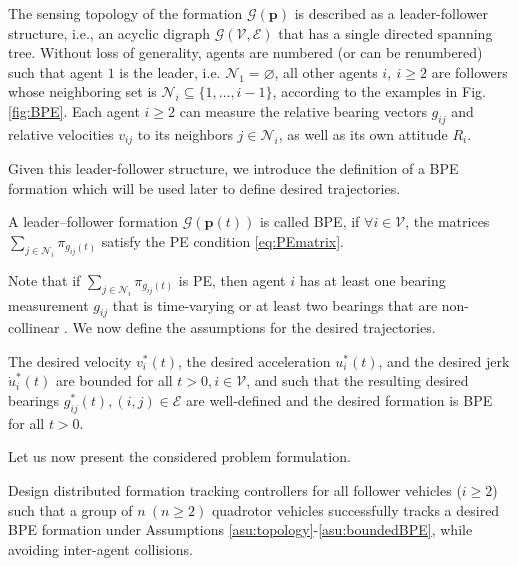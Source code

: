 \begin{asu} \label{asu:topology} 
    The sensing topology of the formation $\mathcal G (\boldsymbol p)$ is described as a leader-follower structure, i.e., an acyclic digraph $\mathcal{G}(\mathcal{V}, \mathcal{E})$ that has a single directed spanning tree. 
    Without loss of generality, agents are numbered (or can be renumbered) such that agent $1$ is the leader, i.e.  $\mathcal{N}_1= \varnothing$,  all other agents $i, \ i\ge 2$ are followers whose neighboring set is $\mathcal{N}_i  \subseteq \{1, \ldots, i-1\}$, according to the examples in Fig. \ref{fig:BPE}.
    Each agent $i \geq 2$ can measure the relative bearing vectors $g_{ij}$ and relative velocities $v_{ij}$ to its neighbors $j \in \mathcal{N}_i$, as well as its own attitude $R_i$. %
\end{asu}

Given this leader-follower structure, we introduce the definition of a BPE formation \cite{tang2021formation} which will be used later to define desired trajectories.
\begin{defi} \label{def:BPE}
    A leader–follower formation $\mathcal{G}(\boldsymbol p(t))$ is called BPE, if $\forall i \in \mathcal{V}$, the matrices $\sum_{j\in \mathcal{N}_i} \pi_{g_{ij}(t)}$ satisfy the PE condition \eqref{eq:PEmatrix}.
\end{defi}
Note that if $\sum_{j\in \mathcal{N}_i} \pi_{g_{ij}(t)}$ is PE, then agent $i$ has at least one bearing measurement $g_{ij}$ that is time-varying or at least two bearings that are non-collinear \cite[Lemma 1]{tang2021formation}. We now define the assumptions for the desired trajectories.
\begin{asu} \label{asu:boundedBPE}
    The desired velocity $v_{i}^*(t)$, the desired acceleration $u_i^*(t)$, and the desired jerk $\dot{u}_i^*(t)$ are bounded for all $t > 0, i \in \mathcal V$, and such that the resulting desired bearings $g_{ij}^*(t), (i,j)\in \mathcal E$ are well-defined and the desired formation is BPE for all $t > 0$.
\end{asu}

Let us now present the considered problem formulation.
\begin{prob} \label{prob:statement}
Design distributed formation tracking controllers for all follower vehicles ($i\ge 2$) such that a group of $n\ (n\ge2)$ quadrotor vehicles successfully tracks a desired BPE formation under Assumptions \ref{asu:topology}-\ref{asu:boundedBPE}, while avoiding inter-agent collisions.
\end{prob}